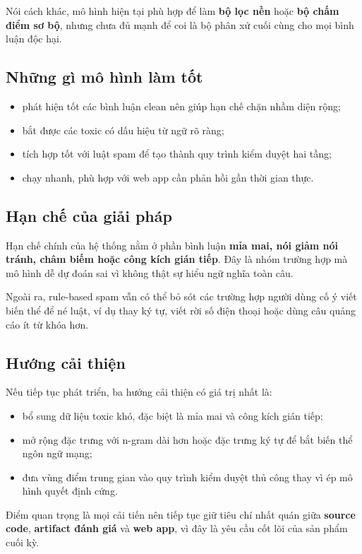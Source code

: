 \documentclass[12pt,a4paper]{article}
\begin{document}
Nói cách khác, mô hình hiện tại phù hợp để làm \textbf{bộ lọc nền} hoặc \textbf{bộ chấm điểm sơ bộ}, nhưng chưa đủ mạnh để coi là bộ phân xử cuối cùng cho mọi bình luận độc hại.

\subsection{Những gì mô hình làm tốt}
\begin{itemize}[leftmargin=1.2cm]
    \item phát hiện tốt các bình luận clean nên giúp hạn chế chặn nhầm diện rộng;
    \item bắt được các toxic có dấu hiệu từ ngữ rõ ràng;
    \item tích hợp tốt với luật spam để tạo thành quy trình kiểm duyệt hai tầng;
    \item chạy nhanh, phù hợp với web app cần phản hồi gần thời gian thực.
\end{itemize}

\subsection{Hạn chế của giải pháp}
Hạn chế chính của hệ thống nằm ở phần bình luận \textbf{mỉa mai, nói giảm nói tránh, châm biếm hoặc công kích gián tiếp}. Đây là nhóm trường hợp mà mô hình dễ dự đoán sai vì không thật sự hiểu ngữ nghĩa toàn câu.

Ngoài ra, rule-based spam vẫn có thể bỏ sót các trường hợp người dùng cố ý viết biến thể để né luật, ví dụ thay ký tự, viết rời số điện thoại hoặc dùng câu quảng cáo ít từ khóa hơn.

\subsection{Hướng cải thiện}
Nếu tiếp tục phát triển, ba hướng cải thiện có giá trị nhất là:
\begin{itemize}[leftmargin=1.2cm]
    \item bổ sung dữ liệu toxic khó, đặc biệt là mỉa mai và công kích gián tiếp;
    \item mở rộng đặc trưng với n-gram dài hơn hoặc đặc trưng ký tự để bắt biến thể ngôn ngữ mạng;
    \item đưa vùng điểm trung gian vào quy trình kiểm duyệt thủ công thay vì ép mô hình quyết định cứng.
\end{itemize}

Điểm quan trọng là mọi cải tiến nên tiếp tục giữ tiêu chí nhất quán giữa \textbf{source code}, \textbf{artifact đánh giá} và \textbf{web app}, vì đây là yêu cầu cốt lõi của sản phẩm cuối kỳ.
\end{document}
